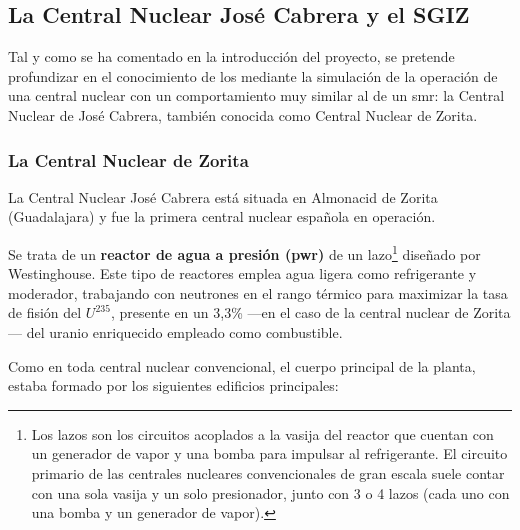 \subsection{La Central Nuclear José Cabrera y el SGIZ}

Tal y como se ha comentado en la introducción del proyecto, se pretende profundizar en el conocimiento de los \emph{} mediante la simulación de la operación de una central nuclear con un comportamiento muy similar al de un \acrshort{smr}: la Central Nuclear de José Cabrera, también conocida como Central Nuclear de Zorita.

\subsubsection{La Central Nuclear de Zorita}

La Central Nuclear José Cabrera está situada en Almonacid de Zorita (Guadalajara) y fue la primera central nuclear española en operación.

Se trata de un \textbf{reactor de agua a presión (\acrshort{pwr})} de un lazo\footnote{Los lazos son los circuitos acoplados a la vasija del reactor que cuentan con un generador de vapor y una bomba para impulsar al refrigerante. El circuito primario de las centrales nucleares convencionales de gran escala suele contar con una sola vasija y un solo presionador, junto con 3 o 4 lazos (cada uno con una bomba y un generador de vapor).} diseñado por Westinghouse. Este tipo de reactores emplea agua ligera como refrigerante y moderador, trabajando con neutrones en el rango térmico para maximizar la tasa de fisión del $U^{235}$, presente en un 3,3\% ---en el caso de la central nuclear de Zorita--- del uranio enriquecido empleado como combustible.

Como en toda central nuclear convencional, el cuerpo principal de la planta, estaba formado por los siguientes edificios principales:

